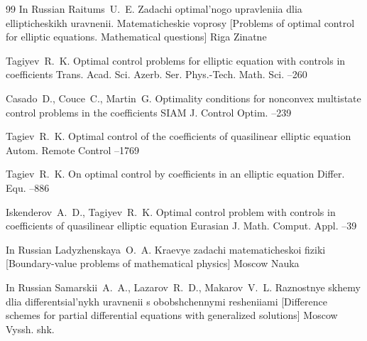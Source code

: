 \begin{thebibliography}{99}
\lang In Russian
\by Raitums~U.~E.
\book Zadachi optimal'nogo upravleniia dlia ellipticheskikh uravnenii. Matematicheskie voprosy \rm [Problems of optimal control for elliptic equations. Mathematical questions]
\publaddr Riga
\publ Zinatne


\by Tagiyev~R.~K.
\paper Optimal control problems for elliptic equation with controls in coefficients
\jour Trans. Acad. Sci. Azerb. Ser. Phys.-Tech. Math. Sci. 
--260


\by Casado~D., Couce~C., Martin~G.
\paper Optimality conditions for nonconvex multistate control problems in the coefficients 
\jour SIAM J. Control Optim.
--239

\by Tagiev~R.~K.
\paper Optimal control of the coefficients of quasilinear elliptic equation 
\jour Autom. Remote Control
--1769

\by Tagiev~R.~K.
\paper On optimal control by coefficients in an elliptic equation
\jour Differ. Equ. 
--886 

\by Iskenderov~A.~D., Tagiyev~R.~K.
\paper Optimal control problem with controls in coefficients of quasilinear elliptic equation 
\jour  Eurasian J. Math. Comput. Appl.
--39


\lang In Russian
\by Ladyzhenskaya~O.~A.
\book Kraevye zadachi matematicheskoi fiziki \rm [Boundary-value problems of mathematical physics]
\publaddr Moscow
\publ Nauka

\lang In Russian
\by Samarskii~A.~A., Lazarov~R.~D., Makarov~V.~L.
\book Raznostnye skhemy dlia differentsial'nykh uravnenii s obobshchennymi resheniiami \rm [Difference schemes for partial differential equations with generalized solutions]
\publaddr Moscow
\publ Vyssh. shk.


\end{thebibliography}

